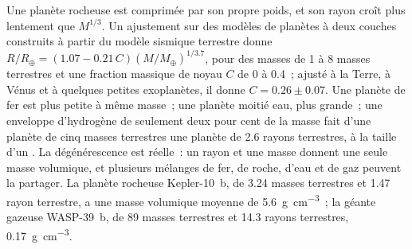 Une planète rocheuse est comprimée par son propre poids, et son rayon croît
plus lentement que $M^{1/3}$. Un ajustement sur des modèles de planètes à deux couches construits
à partir du modèle sismique terrestre donne $R/R_\oplus = (1.07 - 0.21\,C)
(M/M_\oplus)^{1/3.7}$, pour des masses de 1 à 8 masses terrestres et une fraction
massique de noyau $C$ de 0 à 0.4~; ajusté à la Terre, à Vénus et à quelques petites
exoplanètes, il donne $C = 0.26 \pm 0.07$. Une
planète de fer est plus petite à même masse~; une planète moitié eau, plus grande~;
une enveloppe d'hydrogène de seulement deux pour cent de la masse fait d'une planète de
cinq masses terrestres une planète de \num{2.6} rayons terrestres, à la taille d'un
. La dégénérescence est réelle~: un rayon et une masse donnent une seule
masse volumique, et plusieurs mélanges de fer, de roche, d'eau et de gaz peuvent la partager.
La planète rocheuse Kepler-10~b, de 3.24 masses terrestres et 1.47 rayon terrestre,
a une masse volumique moyenne de \qty{5.6}{g.cm^{-3}}~; la géante gazeuse WASP-39~b,
de 89 masses terrestres et 14.3 rayons terrestres, \qty{0.17}{g.cm^{-3}}.

